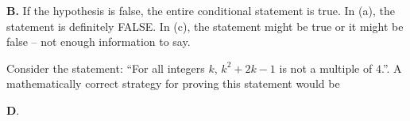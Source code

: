 \documentclass[addpoints]{exam}
\begin{document}
\begin{questions}
\begin{solution}
\textbf{B.} If the hypothesis is false, the entire conditional statement is true. In (a), the statement is definitely FALSE. In (c), the statement might be true or it might be false -- not enough information to say. 
\end{solution}

\question[2] Consider the statement: ``For all integers $k$, $k^2 + 2k - 1$ is not a multiple of $4$.''. A mathematically correct strategy for proving this statement would be

	\begin{solution}
		\textbf{D}. 
	\end{solution}



\end{questions}
\end{document}
